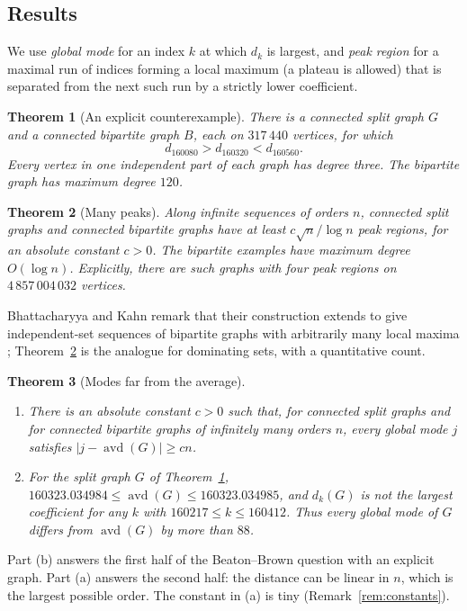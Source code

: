 \documentclass[11pt,a4paper]{article}
\newtheorem{theorem}{Theorem}[section]
\theoremstyle{definition}
\theoremstyle{remark}
\newcommand{\avd}{\operatorname{avd}}
\begin{document}
\subsection{Results}
We use \emph{global mode} for an index $k$ at which $d_k$ is largest, and \emph{peak region} for a maximal run of indices forming a local maximum (a plateau is allowed) that is separated from the next such run by a strictly lower coefficient.

\begin{theorem}[An explicit counterexample]\label{thm:finite}
There is a connected split graph $G$ and a connected bipartite graph $B$, each on $317\,440$ vertices, for which
\[
d_{160080}>d_{160320}<d_{160560}.
\]
Every vertex in one independent part of each graph has degree three. The bipartite graph has maximum degree $120$.
\end{theorem}

\begin{theorem}[Many peaks]\label{thm:many-summary}
Along infinite sequences of orders $n$, connected split graphs and connected bipartite graphs have at least $c\sqrt n/\log n$ peak regions, for an absolute constant $c>0$. The bipartite examples have maximum degree $O(\log n)$. Explicitly, there are such graphs with four peak regions on $4\,857\,004\,032$ vertices.
\end{theorem}
Bhattacharyya and Kahn remark that their construction extends to give independent-set sequences of bipartite graphs with arbitrarily many local maxima \cite[Section~3]{BK}; Theorem~\ref{thm:many-summary} is the analogue for dominating sets, with a quantitative count.

\begin{theorem}[Modes far from the average]\label{thm:mean-summary}
\begin{enumerate}[label=(\alph*)]
\item There is an absolute constant $c>0$ such that, for connected split graphs and for connected bipartite graphs of infinitely many orders $n$, every global mode $j$ satisfies $|j-\avd(G)|\ge cn$.
\item For the split graph $G$ of Theorem~\ref{thm:finite}, $160323.034984\le\avd(G)\le 160323.034985$, and $d_k(G)$ is not the largest coefficient for any $k$ with $160217\le k\le 160412$. Thus every global mode of $G$ differs from $\avd(G)$ by more than $88$.
\end{enumerate}
\end{theorem}
Part (b) answers the first half of the Beaton--Brown question with an explicit graph. Part (a) answers the second half: the distance can be linear in $n$, which is the largest possible order. The constant in (a) is tiny (Remark~\ref{rem:constants}).
\end{document}
